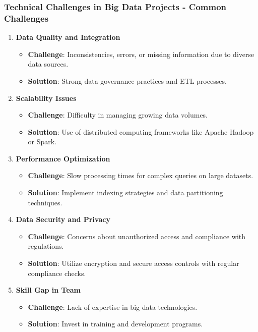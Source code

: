 \documentclass[aspectratio=169]{beamer}
\begin{document}
\begin{frame}[fragile]
    \frametitle{Technical Challenges in Big Data Projects - Common Challenges}
    
    \begin{enumerate}
        \item \textbf{Data Quality and Integration}
            \begin{itemize}
                \item \textbf{Challenge}: Inconsistencies, errors, or missing information due to diverse data sources.
                \item \textbf{Solution}: Strong data governance practices and ETL processes.
            \end{itemize}
        
        \item \textbf{Scalability Issues}
            \begin{itemize}
                \item \textbf{Challenge}: Difficulty in managing growing data volumes.
                \item \textbf{Solution}: Use of distributed computing frameworks like Apache Hadoop or Spark.
            \end{itemize}
        
        \item \textbf{Performance Optimization}
            \begin{itemize}
                \item \textbf{Challenge}: Slow processing times for complex queries on large datasets.
                \item \textbf{Solution}: Implement indexing strategies and data partitioning techniques.
            \end{itemize}
        
        \item \textbf{Data Security and Privacy}
            \begin{itemize}
                \item \textbf{Challenge}: Concerns about unauthorized access and compliance with regulations.
                \item \textbf{Solution}: Utilize encryption and secure access controls with regular compliance checks.
            \end{itemize}
        
        \item \textbf{Skill Gap in Team}
            \begin{itemize}
                \item \textbf{Challenge}: Lack of expertise in big data technologies.
                \item \textbf{Solution}: Invest in training and development programs.
            \end{itemize}
    \end{enumerate}
\end{frame}
\end{document}
